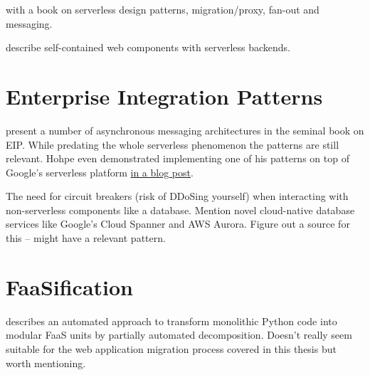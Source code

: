 \textcite{zambrano18patterns} with a book on serverless design patterns, migration/proxy, fan-out and messaging.

\textcite{ast17webcomponent} describe self-contained web components with serverless backends.

\section{Enterprise Integration Patterns}

\textcite{hohpe2004enterprise} present a number of asynchronous messaging architectures in the seminal book on EIP. While predating the whole serverless phenomenon the patterns are still relevant. Hohpe even demonstrated implementing one of his patterns on top of Google's serverless platform \href{http://www.enterpriseintegrationpatterns.com/ramblings/google_cloud_functions.html}{in a blog post}.

The need for circuit breakers (risk of DDoSing yourself) when interacting with non-serverless components like a database. Mention novel cloud-native database services like Google's Cloud Spanner and AWS Aurora. Figure out a source for this -- \textcite{hohpe2004enterprise} might have a relevant pattern.

\section{FaaSification}

\textcite{spillner17transformpython} describes an automated approach to transform monolithic Python code into modular FaaS units by partially automated decomposition. Doesn't really seem suitable for the web application migration process covered in this thesis but worth mentioning.
